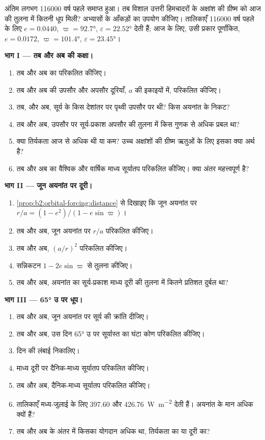 \begin{problem}\label{pb:b2:orbital-forcing:1}
अंतिम  लगभग \num{116000} वर्ष पहले समाप्त हुआ। तब विशाल उत्तरी हिमचादरों के
अक्षांश की ग्रीष्म को आज की तुलना में कितनी धूप मिली? अभ्यासों के आँकड़ों का उपयोग कीजिए।
तालिकाएँ \num{116000} वर्ष पहले के लिए $e = 0.0440$, $\varpi = \ang{92.7}$,
$\varepsilon = \ang{22.52}$ देती हैं; आज के लिए, उसी प्रकार पूर्णांकित, $e = 0.0172$, $\varpi = \ang{101.4}$,
$\varepsilon = \ang{23.45}$।

\medskip\noindent\textbf{भाग I --- तब और अब की कक्षा।}
\begin{enumerate}
  \item तब और अब का  परिकलित कीजिए।
  \item तब और अब की उपसौर और अपसौर दूरियाँ, $a$ की इकाइयों में, परिकलित कीजिए।
  \item तब, और अब, सूर्य के किस देशांतर पर पृथ्वी उपसौर पर थी? किस अयनांत के निकट?
  \item तब और अब, उपसौर पर सूर्य-प्रकाश अपसौर की तुलना में किस गुणक से अधिक प्रबल था?
  \item क्या तिर्यकता आज से अधिक थी या कम? उच्च अक्षांशों की ग्रीष्म ऋतुओं के लिए
        इसका क्या अर्थ है?
  \item तब और अब का वैश्विक और वार्षिक माध्य सूर्यातप परिकलित कीजिए। क्या अंतर महत्त्वपूर्ण है?
\end{enumerate}

\medskip\noindent\textbf{भाग II --- जून अयनांत पर दूरी।}
\begin{enumerate}[resume]
  \item \cref{prop:b2:orbital-forcing:distance} से दिखाइए कि जून अयनांत पर $r/a = (1 -
        e^2)/(1 - e\sin\varpi)$।
  \item तब और अब, जून अयनांत पर $r/a$ परिकलित कीजिए।
  \item तब और अब, $(a/r)^2$ परिकलित कीजिए।
  \item सन्निकटन $1 - 2e\sin\varpi$ से तुलना कीजिए।
  \item तब और अब, अयनांत का सूर्य-प्रकाश माध्य दूरी की तुलना में कितने प्रतिशत दुर्बल था?
\end{enumerate}

\medskip\noindent\textbf{भाग III --- \ang{65} उ पर धूप।}
\begin{enumerate}[resume]
  \item तब और अब, जून अयनांत पर सूर्य की क्रांति दीजिए।
  \item तब और अब, उस दिन \ang{65} उ पर सूर्यास्त का घंटा कोण परिकलित कीजिए।
  \item दिन की लंबाई निकालिए।
  \item माध्य दूरी पर दैनिक-माध्य सूर्यातप परिकलित कीजिए।
  \item तब और अब, दैनिक-माध्य सूर्यातप परिकलित कीजिए।
  \item तालिकाएँ मध्य-जुलाई के लिए 397.60 और \qty{426.76}{W.m^{-2}} देती हैं। अयनांत के
        मान अधिक क्यों हैं?
  \item तब और अब के अंतर में किसका योगदान अधिक था, तिर्यकता का या दूरी का?
\end{enumerate}


\end{problem}
